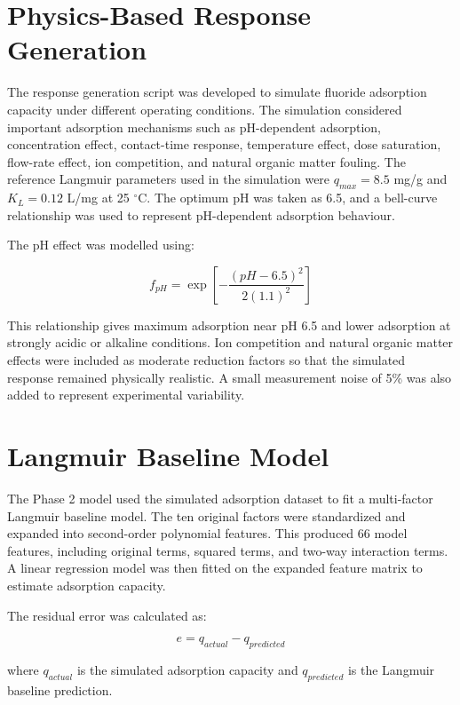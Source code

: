 \section{Physics-Based Response Generation}

The response generation script was developed to simulate fluoride adsorption capacity under different operating conditions. The simulation considered important adsorption mechanisms such as pH-dependent adsorption, concentration effect, contact-time response, temperature effect, dose saturation, flow-rate effect, ion competition, and natural organic matter fouling. The reference Langmuir parameters used in the simulation were $q_{max}=8.5$ mg/g and $K_L=0.12$ L/mg at 25 $^\circ$C. The optimum pH was taken as 6.5, and a bell-curve relationship was used to represent pH-dependent adsorption behaviour.

The pH effect was modelled using:

\begin{equation}
	f_{pH} = \exp \left[-\frac{(pH - 6.5)^2}{2(1.1)^2}\right]
	\label{eq:ph_effect}
\end{equation}

This relationship gives maximum adsorption near pH 6.5 and lower adsorption at strongly acidic or alkaline conditions. Ion competition and natural organic matter effects were included as moderate reduction factors so that the simulated response remained physically realistic. A small measurement noise of 5\% was also added to represent experimental variability.

\section{Langmuir Baseline Model}

The Phase 2 model used the simulated adsorption dataset to fit a multi-factor Langmuir baseline model. The ten original factors were standardized and expanded into second-order polynomial features. This produced 66 model features, including original terms, squared terms, and two-way interaction terms. A linear regression model was then fitted on the expanded feature matrix to estimate adsorption capacity.

The residual error was calculated as:

\begin{equation}
	e = q_{actual} - q_{predicted}
	\label{eq:residual}
\end{equation}

where $q_{actual}$ is the simulated adsorption capacity and $q_{predicted}$ is the Langmuir baseline prediction.

